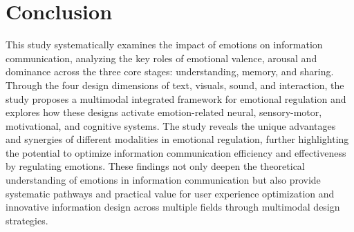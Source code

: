 \section{Conclusion} 
This study systematically examines the impact of emotions on information communication, analyzing the key roles of emotional valence, arousal and dominance across the three core stages: understanding, memory, and sharing. Through the four design dimensions of text, visuals, sound, and interaction, the study proposes a multimodal integrated framework for emotional regulation and explores how these designs activate emotion-related neural, sensory-motor, motivational, and cognitive systems. The study reveals the unique advantages and synergies of different modalities in emotional regulation, further highlighting the potential to optimize information communication efficiency and effectiveness by regulating emotions. These findings not only deepen the theoretical understanding of emotions in information communication but also provide systematic pathways and practical value for user experience optimization and innovative information design across multiple fields through multimodal design strategies.

